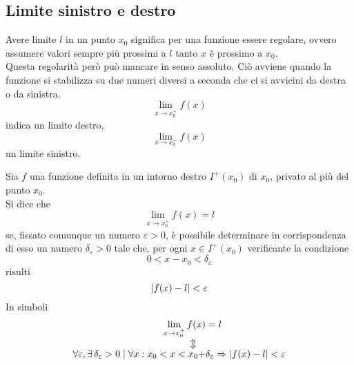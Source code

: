 \subsection{Limite sinistro e destro}
Avere limite $l$ in un punto $x_0$ significa per una funzione essere regolare, ovvero assumere valori
sempre più prossimi a $l$ tanto $x$ è prossimo a $x_0$.\\
Questa regolarità però può mancare in senso assoluto. Ciò avviene quando la funzione si stabilizza
su due numeri diversi a seconda che ci si avvicini da destra o da sinistra.
\begin{equation*}
\lim\limits_{x\to x_0^+}f(x)
\end{equation*}
indica un limite destro,
\begin{equation*}
\lim\limits_{x\to x_0^-}f(x)
\end{equation*}
un limite sinistro.
\begin{definizioneLimiteFinitoDestro}
	Sia $f$ una funzione definita in un intorno destro $I^+(x_0)$ di $x_0$, privato al più del punto
	$x_0$.\\
	Si dice che
	\begin{equation*}
	\lim\limits_{x\to x_0^+}f(x) = l
	\end{equation*}
	se, fissato comunque un numero $\varepsilon>0$, è possibile determinare in corrispondenza di esso
	un numero $\delta_\varepsilon>0$ tale che, per ogni $x\in I^+(x_0)$ verificante la condizione
	\begin{equation*}
	0<x-x_0<\delta_\varepsilon
	\end{equation*}
	risulti
	\begin{equation*}
	\lvert f(x)-l\rvert<\varepsilon
	\end{equation*}
	In simboli
	\begin{align*}
	\lim\limits_{x\to x_0^+} f(x) &= l\\
	\ArrowBetweenLines
	\forall \varepsilon, \exists\,\delta_\varepsilon>0\mid\forall x: x_0< x <x_0+&\delta_\varepsilon 
	\Rightarrow \vert f(x) - l\vert < \varepsilon
	\end{align*}
\end{definizioneLimiteFinitoDestro}
